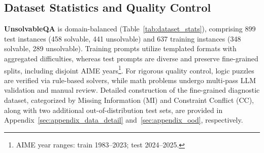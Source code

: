 \begin{table}[t]
    \centering
    
    
    \caption{Unified vertical statistics for \textbf{UnsolvableQA} train/test partitions. Train Maze has no difficulty split; AIME year ranges differ.}
    \vspace{-5pt}
    \label{tab:dataset_stats}
\end{table}
\subsection{Dataset Statistics and Quality Control}
\textbf{UnsolvableQA} is domain-balanced (Table~\ref{tab:dataset_stats}), comprising 899 test instances (458 solvable, 441 unsolvable) and 637 training instances (348 solvable, 289 unsolvable). Training prompts utilize templated formats with aggregated difficulties, whereas test prompts are diverse and preserve fine-grained splits, including disjoint AIME years\footnote{AIME year ranges: train 1983--2023; test 2024--2025.}. For rigorous quality control, logic puzzles are verified via rule-based solvers, while math problems undergo multi-pass LLM validation and manual review. Detailed construction of the fine-grained diagnostic dataset, categorized by Missing Information (MI) and Constraint Conflict (CC), along with two additional out-of-distribution test sets, are provided in Appendix~\ref{sec:appendix_data_detail} and~\ref{sec:appendix_ood}, respectively.
